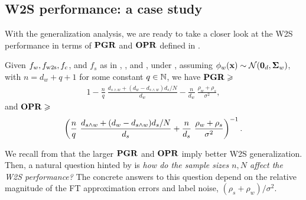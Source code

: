 \subsection{W2S performance: a case study}\label{sec:w2s_performance}
With the generalization analysis, we are ready to take a closer look at the W2S performance in terms of $\mathbf{PGR}$ and $\mathbf{OPR}$ defined in . 

\begin{proposition}\label{cor:pgr}
    Given $f_w, f_{\mathrm{w2s}}, f_c$, and $f_s$ as in , , and , under , assuming $\phi_w(\mathbf{x}) \sim \mathcal{N}(\textbf0_d, \boldsymbol{\Sigma}_w)$, with $n = d_w + q + 1$ for some constant $q \in \mathbb{N}$, we have $\mathbf{PGR} \geqslant$
    \begin{align*}
        1 - \frac{n}{q}\ {\frac{d_{s \wedge w} + (d_w - d_{s \wedge w}) d_s / N}{d_w}} - \frac{n}{d_w}\ {\frac{\rho_w + \rho_s}{\sigma^2}},
    \end{align*}
    and $\mathbf{OPR} \geqslant$
    \begin{align*}
        \left(\frac{n}{q}\ \frac{d_{s \wedge w} + (d_w - d_{s \wedge w}) {d_s}/{N}}{d_s} + \frac{n}{d_s}\ \frac{\rho_w + \rho_s}{\sigma^2}\right)^{-1}.
    \end{align*}
\end{proposition}

We recall from  that the larger $\mathbf{PGR}$ and $\mathbf{OPR}$ imply better W2S generalization. Then, a natural question hinted by  is \emph{how do the sample sizes $n, N$ affect the W2S performance?} The concrete answers to this question depend on the relative magnitude of the FT approximation errors and label noise, $(\rho_s + \rho_w)/\sigma^2$. 

